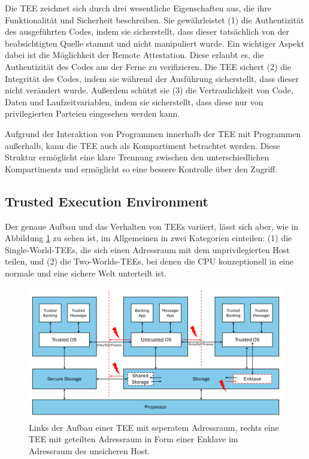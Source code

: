 Die TEE zeichnet sich durch drei wesentliche Eigenschaften aus, die ihre Funktionalität und Sicherheit beschreiben. 
Sie gewährleistet (1) die Authentizität des ausgeführten Codes, indem sie sicherstellt, dass dieser tatsächlich von der beabsichtigten Quelle stammt und nicht manipuliert wurde. 
Ein wichtiger Aspekt dabei ist die Möglichkeit der Remote Attestation. Diese erlaubt es, die Authentizität des Codes aus der Ferne zu verifizieren. 
Die TEE sichert (2) die Integrität des Codes, indem sie während der Ausführung sicherstellt, dass dieser nicht verändert wurde. Außerdem schützt sie (3) die Vertraulichkeit von Code, Daten und Laufzeitvariablen, indem sie sicherstellt, dass diese nur von privilegierten Parteien eingesehen werden kann\cite{Trusted}.

Aufgrund der Interaktion von Programmen innerhalb der TEE mit Programmen außerhalb, kann die TEE auch als Kompartiment betrachtet werden. Diese Struktur ermöglicht eine klare Trennung zwischen den unterschiedlichen Kompartiments und ermöglicht so eine bessere Kontrolle über den Zugriff.

\subsection{Trusted Execution Environment}
Der genaue Aufbau und das Verhalten von TEEs variiert, lässt sich aber, wie in Abbildung \ref{fig:TEE} zu sehen ist, im Allgemeinen in zwei Kategorien einteilen: (1) die Single-World-TEEs, die sich einen Adressraum mit dem unprivilegierten Host teilen, und (2) die Two-Worlds-TEEs, bei denen die CPU konzeptionell in eine normale und eine sichere Welt unterteilt ist\cite{TEEPaper}.

\begin{figure}[h]
    \centering
    \includegraphics[width=\linewidth]{Grafiken/TEE-Grafik.png}
    \caption{Links der Aufbau einer TEE mit seperatem Adressraum, rechts eine TEE mit geteilten Adressraum in Form einer Enklave im Adressraum des unsicheren Host.}
    \label{fig:TEE}
\end{figure}

